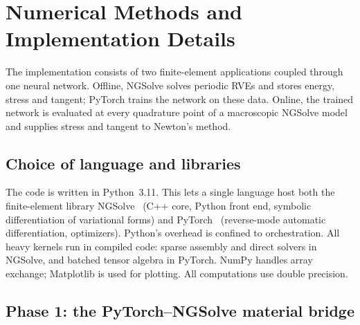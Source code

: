 \chapter{Numerical Methods and Implementation Details}\label{ch:methods}

The implementation consists of two finite-element applications coupled through
one neural network. Offline, NGSolve solves periodic RVEs and stores energy,
stress and tangent; PyTorch trains the network on these data. Online, the trained
network is evaluated at every quadrature point of a macroscopic NGSolve model and
supplies stress and tangent to Newton's method.

\section{Choice of language and libraries}

The code is written in Python~3.11. This lets a single language host both the
finite-element library NGSolve~\cite{Schoeberl2014} (C++ core, Python front end,
symbolic differentiation of variational forms) and PyTorch~\cite{Paszke2019}
(reverse-mode automatic differentiation, optimizers). Python's overhead is
confined to orchestration. All heavy kernels run in compiled code: sparse
assembly and direct solvers in NGSolve, and batched tensor algebra in PyTorch.
NumPy handles array exchange; Matplotlib is used for plotting. All computations
use double precision.

\section{Phase 1: the PyTorch--NGSolve material bridge}\label{sec:bridge}

